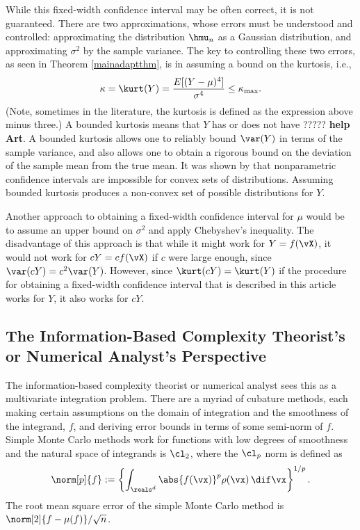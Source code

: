 \documentclass[graybox]{svmult}
\begin{document}
While this fixed-width confidence interval may be often correct, it is not guaranteed. There are two approximations, whose errors must be understood and controlled: approximating the distribution $\hmu_n$ as a Gaussian distribution, and approximating $\sigma^2$ by the sample variance.  The key to controlling these two errors, as seen in Theorem \ref{mainadaptthm}, is in assuming a bound on the kurtosis, i.e., 
\begin{equation} \label{boundedkurt}
\kappa=\kurt(Y) = \frac{E[(Y-\mu)^4]}{\sigma^4} \le \kappa_{\max}.
\end{equation}
(Note, sometimes in the literature, the kurtosis is defined as the expression above minus three.)  A bounded kurtosis means that $Y$ has or does not have ????? {\bf help Art}. A bounded kurtosis allows one to reliably bound $\var(Y)$ in terms of the sample variance, and also allows one to obtain a rigorous bound on the deviation of the sample mean from the true mean.  It was shown by \cite[Corollary 2]{BahSav56} that nonparametric confidence intervals are impossible for convex sets of distributions. Assuming bounded kurtosis produces a non-convex set of possible distributions for $Y$.

Another approach to obtaining a fixed-width confidence interval for $\mu$ would be to assume an upper bound on $\sigma^2$ and apply Chebyshev's inequality.  The disadvantage of this approach is that while it might work for $Y=f(\vX)$, it would not work for $cY=cf(\vX)$ if $c$ were large enough, since $\var(cY)=c^2 \var(Y)$.  However, since $\kurt(cY)=\kurt(Y)$ if the procedure for obtaining a fixed-width confidence interval that is described in this article works for $Y$, it also works for $cY$.

\subsection{The Information-Based Complexity Theorist's or Numerical Analyst's Perspective} 
The information-based complexity theorist or numerical analyst sees this as a multivariate integration problem.  There are a myriad of cubature methods, each making certain assumptions on the domain of integration and the smoothness of the integrand, $f$, and deriving error bounds in terms of some semi-norm of $f$. Simple Monte Carlo methods work for functions with low degrees of smoothness and the natural space of integrands is $\cl_2$, where the $\cl_{p}$ norm is defined as
\begin{equation} \label{Lpnormdef}
\norm[p]{f} :=\left\{\int_{\reals^d} \abs{f(\vx)}^p \rho(\vx) \, \dif \vx\right\}^{1/p}.
\end{equation}
The root mean square error of the simple Monte Carlo method is $\norm[2]{f-\mu(f)}/\sqrt{n}$.
\end{document}
